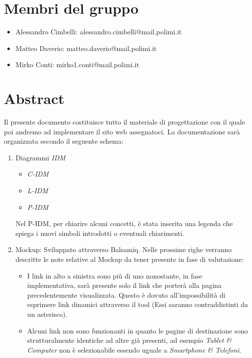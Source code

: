 \documentclass{article}
\begin{document}
	\tableofcontents
	
	\clearpage
	\section{Membri del gruppo}
	\begin{itemize}
		\item Alessandro Cimbelli: alessandro.cimbelli@mail.polimi.it
		\item Matteo Daverio: matteo.daverio@mail.polimi.it
		\item Mirko Conti: mirko1.conti@mail.polimi.it
	\end{itemize}
	
	\clearpage
	
	\section{Abstract}
	Il presente documento costituisce tutto il materiale di progettazione con il quale poi andremo ad implementare il sito web assegnatoci.
	La documentazione sarà organizzata secondo il seguente schema:
	
	\begin{enumerate}
		\item Diagrammi \emph{IDM} 
			\begin{itemize}
				\item \emph{C-IDM}
				\item \emph{L-IDM}
				\item \emph{P-IDM}
			\end{itemize}
			
			Nel P-IDM, per chiarire alcuni concetti, è stata inserita una legenda che spiega i nuovi simboli introdotti o eventuali chiarimenti.
	
		\item Mockup: Sviluppato attraverso Balsamiq. Nelle prossime righe verranno descritte le note relative al Mockup da tener presente in fase di valutazione:
		\begin{itemize}
			\item I link in alto a sinistra sono più di uno nonostante, in fase implementativa, sarà presente solo il link che porterà alla pagina precedentemente visualizzata. Questo è dovuto all'impossibilità di esprimere link dinamici attraverso il tool (Essi saranno contraddistinti da un asterisco).
			\item Alcuni link non sono funzionanti in quanto le pagine di destinazione sono strutturalmente identiche ad altre già presenti, ad esempio \emph{Tablet \& Computer} non è selezionabile essendo uguale a \emph{Smartphone \& Telefoni}.
		\end{itemize}
	\end{enumerate}
		
\end{document}
